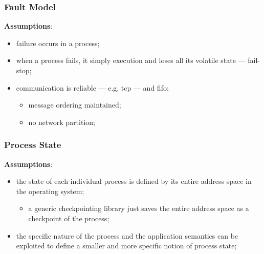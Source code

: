 \documentclass[11pt, a4paper]{article}
\begin{document}
\subsubsection{Fault Model}\label{sec:fault_model} %
\textbf{Assumptions}:
\begin{itemize}
    \item failure occurs in a process;
    \item when a process fails, it simply execution and loses all its volatile state --- fail-stop;
    \item communication is reliable --- e.g, \ac{tcp} --- and \ac{fifo};
    \begin{itemize}
        \item message ordering maintained;
        \item no network partition;
    \end{itemize}
\end{itemize}
%
\subsubsection{Process State}\label{sec:process_state} %
\textbf{Assumptions}:
\begin{itemize}
    \item the state of each individual process is defined by its entire address space in the operating system;
    \begin{itemize}
        \item a generic checkpointing library just saves the entire address space as a checkpoint of the process;
    \end{itemize}
    \item the specific nature of the process and the application semantics can be exploited to define a smaller and more specific notion of process state;
\end{itemize}
%
\end{document}

